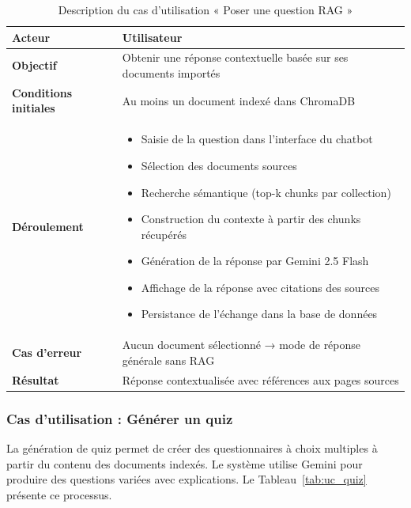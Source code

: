 \begin{table}[H]
\centering
\renewcommand{\arraystretch}{1.2}
\begin{tabular}{|p{4cm}|p{10cm}|}
\hline
\textbf{Acteur} & Utilisateur \\ \hline

\textbf{Objectif} & Obtenir une réponse contextuelle basée sur ses documents importés \\ \hline

\textbf{Conditions initiales} & Au moins un document indexé dans ChromaDB \\ \hline

\textbf{Déroulement} &
\begin{itemize}
    \item Saisie de la question dans l'interface du chatbot
    \item Sélection des documents sources
    \item Recherche sémantique (top-k chunks par collection)
    \item Construction du contexte à partir des chunks récupérés
    \item Génération de la réponse par Gemini 2.5 Flash
    \item Affichage de la réponse avec citations des sources
    \item Persistance de l'échange dans la base de données
\end{itemize} \\ \hline

\textbf{Cas d'erreur} & Aucun document sélectionné → mode de réponse générale sans RAG \\ \hline

\textbf{Résultat} & Réponse contextualisée avec références aux pages sources \\ \hline
\end{tabular}
\caption{Description du cas d'utilisation « Poser une question RAG »}
\label{tab:uc_rag_chat}
\end{table}

\subsubsection{Cas d'utilisation : Générer un quiz}

La génération de quiz permet de créer des questionnaires à choix multiples à partir du contenu des documents indexés. Le système utilise Gemini pour produire des questions variées avec explications. Le Tableau~\ref{tab:uc_quiz} présente ce processus.

